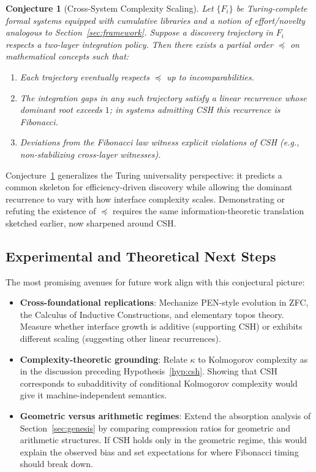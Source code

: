 \documentclass[11pt]{article}
\theoremstyle{definition}
\theoremstyle{plain}
\newtheorem{conjecture}{Conjecture}
\theoremstyle{remark}
\begin{document}
\begin{conjecture}[Cross-System Complexity Scaling]\label{conj:universal}
Let $\{F_i\}$ be Turing-complete formal systems equipped with cumulative libraries and a notion of effort/novelty analogous to Section~\ref{sec:framework}. Suppose a discovery trajectory in $F_i$ respects a two-layer integration policy. Then there exists a partial order $\preceq$ on mathematical concepts such that:
\begin{enumerate}
\item Each trajectory eventually respects $\preceq$ up to incomparabilities.
\item The integration gaps in any such trajectory satisfy a linear recurrence whose dominant root exceeds $1$; in systems admitting CSH this recurrence is Fibonacci.
\item Deviations from the Fibonacci law witness explicit violations of CSH (e.g., non-stabilizing cross-layer witnesses).
\end{enumerate}
\end{conjecture}

Conjecture~\ref{conj:universal} generalizes the Turing universality perspective: it predicts a common skeleton for efficiency-driven discovery while allowing the dominant recurrence to vary with how interface complexity scales. Demonstrating or refuting the existence of $\preceq$ requires the same information-theoretic translation sketched earlier, now sharpened around CSH.

\subsection{Experimental and Theoretical Next Steps}

The most promising avenues for future work align with this conjectural picture:
\begin{itemize}
\item \textbf{Cross-foundational replications}: Mechanize PEN-style evolution in ZFC, the Calculus of Inductive Constructions, and elementary topos theory. Measure whether interface growth is additive (supporting CSH) or exhibits different scaling (suggesting other linear recurrences).
\item \textbf{Complexity-theoretic grounding}: Relate $\kappa$ to Kolmogorov complexity as in the discussion preceding Hypothesis~\ref{hyp:csh}. Showing that CSH corresponds to subadditivity of conditional Kolmogorov complexity would give it machine-independent semantics.
\item \textbf{Geometric versus arithmetic regimes}: Extend the absorption analysis of Section~\ref{sec:genesis} by comparing compression ratios for geometric and arithmetic structures. If CSH holds only in the geometric regime, this would explain the observed bias and set expectations for where Fibonacci timing should break down.
\end{itemize}
\end{document}
